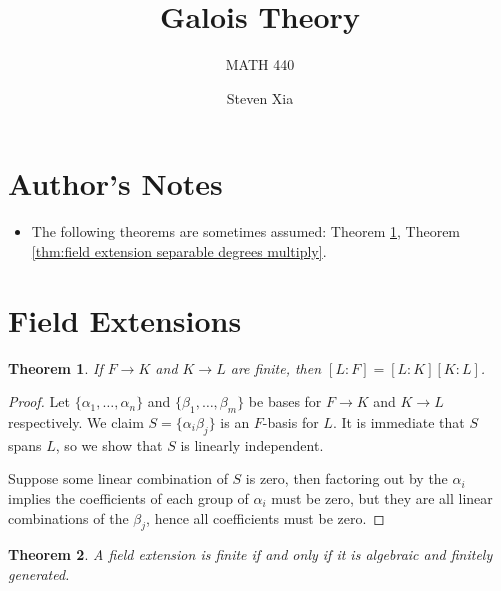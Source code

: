 \documentclass[
    parskip=half,
    toc=flat,
    toc=sectionentrydotfill,
]{scrartcl}  %
\title{Galois Theory}
\subtitle{MATH 440}
\author{Steven Xia}
\theoremstyle{definition}
\theoremstyle{plain}
\newtheorem{theorem}{Theorem}[section]
\theoremstyle{remark}
\begin{document}
\maketitle

\begin{quote} 
\end{quote}

\tableofcontents


\section{Author's Notes}

\begin{itemize}[leftmargin=*]
    \item
        The following theorems are sometimes assumed:
        Theorem \ref{thm:field extension degrees multiply},
        Theorem \ref{thm:field extension separable degrees multiply}.
\end{itemize}


\section{Field Extensions}

\begin{theorem}
    \label{thm:field extension degrees multiply}
    If $F\to K$ and $K\to L$ are finite, then $[L:F]=[L:K][K:L]$.
\end{theorem}

\begin{proof}
    Let $\{\alpha_1,\dots,\alpha_n\}$ and $\{\beta_1,\dots,\beta_m\}$ be bases for $F\to K$ and $K\to L$
    respectively.
    We claim $S=\{\alpha_i\beta_j\}$ is an $F$-basis for $L$.
    It is immediate that $S$ spans $L$, so we show that $S$ is linearly independent.

    Suppose some linear combination of $S$ is zero, then factoring out by the $\alpha_i$ implies the coefficients of
    each group of $\alpha_i$ must be zero, but they are all linear combinations of the $\beta_j$, hence all
    coefficients must be zero.
\end{proof}

\begin{theorem}
    \label{thm:finite iff algebraic and finitely generated}
    A field extension is finite if and only if it is algebraic and finitely generated.
\end{theorem}
\end{document}
